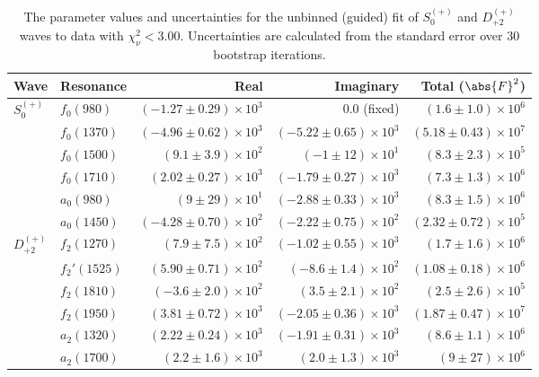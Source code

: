 \begin{table}[ht]
    \begin{center}
        \begin{tabular}{llrrr}\toprule
        Wave & Resonance & Real & Imaginary & Total ($\abs{F}^2$) \\\midrule
$S_{0}^{(+)}$ & $f_{0}(980)$ & $(-1.27 \pm 0.29) \times 10^{3}$ & $0.0$ (fixed) & $(1.6 \pm 1.0) \times 10^{6}$ \\
 & $f_{0}(1370)$ & $(-4.96 \pm 0.62) \times 10^{3}$ & $(-5.22 \pm 0.65) \times 10^{3}$ & $(5.18 \pm 0.43) \times 10^{7}$ \\
 & $f_{0}(1500)$ & $(9.1 \pm 3.9) \times 10^{2}$ & $(-1 \pm 12) \times 10^{1}$ & $(8.3 \pm 2.3) \times 10^{5}$ \\
 & $f_{0}(1710)$ & $(2.02 \pm 0.27) \times 10^{3}$ & $(-1.79 \pm 0.27) \times 10^{3}$ & $(7.3 \pm 1.3) \times 10^{6}$ \\
 & $a_{0}(980)$ & $(9 \pm 29) \times 10^{1}$ & $(-2.88 \pm 0.33) \times 10^{3}$ & $(8.3 \pm 1.5) \times 10^{6}$ \\
 & $a_{0}(1450)$ & $(-4.28 \pm 0.70) \times 10^{2}$ & $(-2.22 \pm 0.75) \times 10^{2}$ & $(2.32 \pm 0.72) \times 10^{5}$ \\
$D_{+2}^{(+)}$ & $f_{2}(1270)$ & $(7.9 \pm 7.5) \times 10^{2}$ & $(-1.02 \pm 0.55) \times 10^{3}$ & $(1.7 \pm 1.6) \times 10^{6}$ \\
 & $f_{2}'(1525)$ & $(5.90 \pm 0.71) \times 10^{2}$ & $(-8.6 \pm 1.4) \times 10^{2}$ & $(1.08 \pm 0.18) \times 10^{6}$ \\
 & $f_{2}(1810)$ & $(-3.6 \pm 2.0) \times 10^{2}$ & $(3.5 \pm 2.1) \times 10^{2}$ & $(2.5 \pm 2.6) \times 10^{5}$ \\
 & $f_{2}(1950)$ & $(3.81 \pm 0.72) \times 10^{3}$ & $(-2.05 \pm 0.36) \times 10^{3}$ & $(1.87 \pm 0.47) \times 10^{7}$ \\
 & $a_{2}(1320)$ & $(2.22 \pm 0.24) \times 10^{3}$ & $(-1.91 \pm 0.31) \times 10^{3}$ & $(8.6 \pm 1.1) \times 10^{6}$ \\
 & $a_{2}(1700)$ & $(2.2 \pm 1.6) \times 10^{3}$ & $(2.0 \pm 1.3) \times 10^{3}$ & $(9 \pm 27) \times 10^{6}$ \\\bottomrule
        \end{tabular}
    \caption{The parameter values and uncertainties for the unbinned (guided) fit of $S_{0}^{(+)}$ and $D_{+2}^{(+)}$ waves to data with $\chi^2_\nu < 3.00$. Uncertainties are calculated from the standard error over $30$ bootstrap iterations.}\label{tab:unbinned-fit-chisqdof-3.0-guided-Sp0p-Dp2p}
    \end{center}
\end{table}
